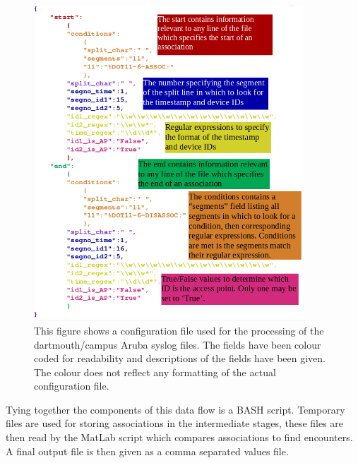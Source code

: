 \begin{figure}[h]
    \centering
    \includegraphics[width=0.9\textwidth]{JSON_config.png}
    \caption{This figure shows a configuration file used for the processing of the dartmouth/campus Aruba syslog files. The fields have been colour coded for readability and descriptions of the fields have been given. The colour does not reflect any formatting of the actual configuration file.}
    \label{fig:JSON_config}
\end{figure}

Tying together the components of this data flow is a BASH script. Temporary files are used for storing associations in the intermediate stages, these files are then read by the MatLab script which compares associations to find encounters. A final output file is then given as a comma separated values file. 


